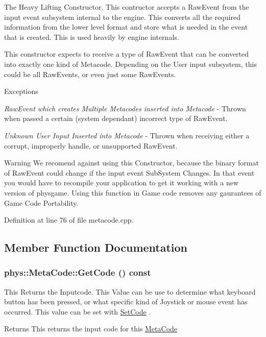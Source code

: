 The Heavy Lifting Constructor. This contructor accepts a RawEvent from the input event subsystem internal to the engine. This converts all the required information from the lower level format and store what is needed in the event that is created. This is used heavily by engine internals. \par
 This constructor expects to receive a type of RawEvent that can be converted into exactly one kind of Metacode. Depending on the User input subsystem, this could be all RawEvents, or even just some RawEvents. 
\begin{DoxyExceptions}{Exceptions}
\item[{\em RawEvent which creates Multiple Metacodes inserted into Metacode}]-\/ Thrown when passed a certain (system dependant) incorrect type of RawEvent. \item[{\em Unknown User Input Inserted into Metacode}]-\/ Thrown when receiving either a corrupt, improperly handle, or unsupported RawEvent. \end{DoxyExceptions}
\begin{DoxyWarning}{Warning}
We recomend against using this Constructor, because the binary format of RawEvent could change if the input event SubSystem Changes. In that event you would have to recompile your application to get it working with a new version of physgame. Using this function in Game code removes any gaurantees of Game Code Portability. 
\end{DoxyWarning}


Definition at line 76 of file metacode.cpp.

\subsection{Member Function Documentation}
\hypertarget{classphys_1_1MetaCode_a5835a05391cbb5a3dc83534a7bcf87d3}{
\subsubsection[{GetCode}]{ phys::MetaCode::GetCode () const}}
\label{da/dc9/classphys_1_1MetaCode_a5835a05391cbb5a3dc83534a7bcf87d3}


This Returns the Inputcode. This Value can be use to determine what keyboard button has been pressed, or what specific kind of Joystick or mouse event has occurred. This value can be set with \hyperlink{classphys_1_1MetaCode_ab6759fbee9d039cf248bf76dde0f33dd}{SetCode} . \begin{DoxyReturn}{Returns}
This returns the input code for this \hyperlink{classphys_1_1MetaCode}{MetaCode} 
\end{DoxyReturn}


